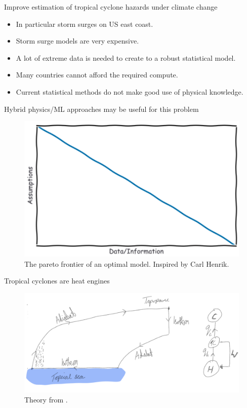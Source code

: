 \begin{frame}{Improve estimation of tropical cyclone hazards under climate change}
\Large
\vspace{-90pt}


\begin{itemize}
    \item In particular storm surges on US east coast.
    \item Storm surge models are very expensive.
    \item A lot of extreme data is needed to create to a robust statistical model.
    \item Many countries cannot afford the required compute.
    \item Current statistical methods do not make good use of physical knowledge.
\end{itemize}


\end{frame}


\begin{frame}{Hybrid physics/ML approaches may be useful for this problem}

\vspace{-20pt}
\begin{figure}
\includegraphics[width=0.7\linewidth]{images/phd/pareto.png}
\caption{The pareto frontier of an optimal model. Inspired by Carl Henrik. }
\end{figure}
\end{frame}


\begin{frame}{Tropical cyclones are heat engines}
\begin{figure}
\includegraphics[width=0.8\linewidth]{images/phd/drawing232115.png}
\caption{Theory from \cite{emanuel1986air}. }
\end{figure}
\end{frame}


